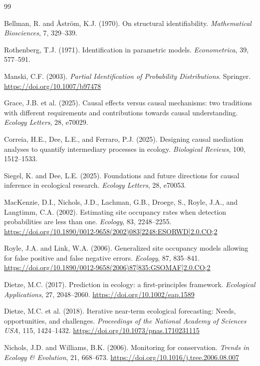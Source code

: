 \begin{thebibliography}{99}

Bellman, R. and \AA{}str\"om, K.J. (1970).
On structural identifiability.
\emph{Mathematical Biosciences}, 7, 329--339.

Rothenberg, T.J. (1971).
Identification in parametric models.
\emph{Econometrica}, 39, 577--591.

Manski, C.F. (2003).
\emph{Partial Identification of Probability Distributions}.
Springer.
\url{https://doi.org/10.1007/b97478}

Grace, J.B. et al. (2025).
Causal effects versus causal mechanisms: two traditions with different requirements and contributions towards causal understanding.
\emph{Ecology Letters}, 28, e70029.

Correia, H.E., Dee, L.E., and Ferraro, P.J. (2025).
Designing causal mediation analyses to quantify intermediary processes in ecology.
\emph{Biological Reviews}, 100, 1512--1533.

Siegel, K. and Dee, L.E. (2025).
Foundations and future directions for causal inference in ecological research.
\emph{Ecology Letters}, 28, e70053.

MacKenzie, D.I., Nichols, J.D., Lachman, G.B., Droege, S., Royle, J.A., and Langtimm, C.A. (2002).
Estimating site occupancy rates when detection probabilities are less than one.
\emph{Ecology}, 83, 2248--2255.
\url{https://doi.org/10.1890/0012-9658(2002)083[2248:ESORWD]2.0.CO;2}

Royle, J.A. and Link, W.A. (2006).
Generalized site occupancy models allowing for false positive and false negative errors.
\emph{Ecology}, 87, 835--841.
\url{https://doi.org/10.1890/0012-9658(2006)87[835:GSOMAF]2.0.CO;2}

Dietze, M.C. (2017).
Prediction in ecology: a first-principles framework.
\emph{Ecological Applications}, 27, 2048--2060.
\url{https://doi.org/10.1002/eap.1589}

Dietze, M.C. et al. (2018).
Iterative near-term ecological forecasting: Needs, opportunities, and challenges.
\emph{Proceedings of the National Academy of Sciences USA}, 115, 1424--1432.
\url{https://doi.org/10.1073/pnas.1710231115}

Nichols, J.D. and Williams, B.K. (2006).
Monitoring for conservation.
\emph{Trends in Ecology \& Evolution}, 21, 668--673.
\url{https://doi.org/10.1016/j.tree.2006.08.007}


\end{thebibliography}
